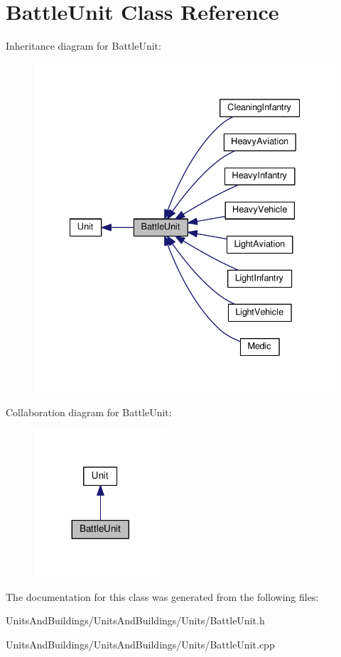 \hypertarget{class_battle_unit}{}\section{Battle\+Unit Class Reference}
\label{class_battle_unit}


Inheritance diagram for Battle\+Unit\+:
\nopagebreak
\begin{figure}[H]
\begin{center}
\leavevmode
\includegraphics[width=335pt]{class_battle_unit__inherit__graph}
\end{center}
\end{figure}


Collaboration diagram for Battle\+Unit\+:
\nopagebreak
\begin{figure}[H]
\begin{center}
\leavevmode
\includegraphics[width=140pt]{class_battle_unit__coll__graph}
\end{center}
\end{figure}


The documentation for this class was generated from the following files\+:\begin{DoxyCompactItemize}
\item 
Units\+And\+Buildings/\+Units\+And\+Buildings/\+Units/Battle\+Unit.\+h\item 
Units\+And\+Buildings/\+Units\+And\+Buildings/\+Units/Battle\+Unit.\+cpp\end{DoxyCompactItemize}

